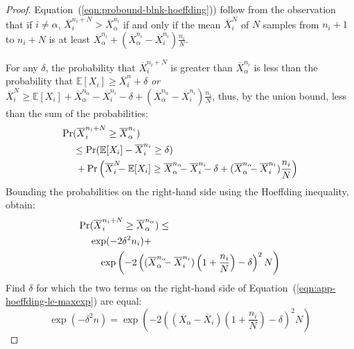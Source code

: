 \documentclass[]{article}
\newcommand {\IE} {\ensuremath {\mathbb{E}}}
\renewcommand{\eqref}[1]{Equation~(\ref{#1})}
\begin{document}
\begin{hiddenproof}
	\begin{proof}
	\eqref{eqn:probound-blnk-hoeffding}) follow from the
	observation that if $i\ne\alpha$, $\overline X_i^{n_i+N}>\overline X_\alpha^{n_i}$
	if and only if the mean $\overline X_i^N$ of $N$ samples from $n_i+1$
	to $n_i+N$ is at least $\overline X_\alpha^{n_i}+(\overline X_\alpha^{n_i}-\overline
	X_i^{n_i})\frac {n_i} N$.

	For any $\delta$, the probability that $\overline X_i^{n_i+N}$ is greater
	than $\overline X_\alpha^{n_i}$ is less than the probability that
	$\IE[X_i]\ge\overline X_i^n+\delta$
	\emph{or} $\overline X_i^N\ge \IE[X_i]+\overline X_\alpha^{n_\alpha}
	- \overline X_i^{n_i} - \delta +(\overline X_\alpha^{n_\alpha} - \overline X_i^{n_i})\frac {n_i} N$,
	thus, by the union bound, less than the sum of the probabilities:
	\begin{align}
	\Pr&(\overline X_i^{n_i+N}\ge \overline X_\alpha^{n_i})\nonumber\\
	   &\le\Pr(\IE[X_i]-\overline X_i^{n_i} \ge \delta)\\
	   &\hspace{0.25em}+\Pr\left(\overline X_i^N\hspace{-0.5em} - \IE[X_i] \ge \overline X_\alpha^{n_\alpha}\hspace{-0.5em}
	           - \overline X_i^{n_i}\hspace{-0.5em} - \delta +(\overline X_\alpha^{n_\alpha}\hspace{-0.5em} - \overline X_i^{n_i})\frac {n_i} N\right)\nonumber
	\end{align}
	Bounding the probabilities on the right-hand side using the Hoeffding
	inequality, obtain:
	\begin{align}
	\Pr&(\overline X_i^{n_i+N}\ge \overline X_\alpha^{n_\alpha})\le \nonumber\\
	    &\exp(-2\delta^2n_i)+\nonumber\\
	    &\quad\exp\left(-2\left((\overline X_\alpha^{n_\alpha}\hspace{-0.5em}
	         - \overline X_i^{n_i})\left(1+\frac {n_i} N\right)
	         - \delta\right)^2N\right)
	\label{eqn:app-hoeffding-le-maxexp}
	\end{align}
	Find $\delta$ for which the two terms on the right-hand side of
	\eqref{eqn:app-hoeffding-le-maxexp} are equal:
	\begin{equation}
	\exp(-\delta^2n) = \exp\left(-2\left((\overline X_\alpha - \overline X_i)(1+\frac {n_i} N) - \delta\right)^2N\right)\label{eqn:app-hoeffding-eq-exp}

\end{equation}
\end{proof}
\end{hiddenproof}
\end{document}
